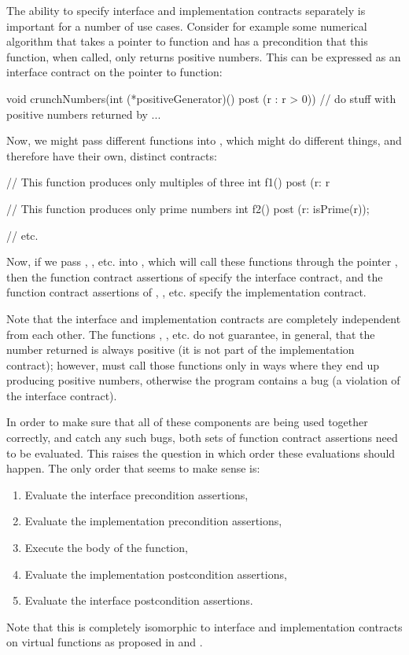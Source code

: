 The ability to specify interface and implementation contracts separately is important for a number of use cases. Consider for example some numerical algorithm  that takes a pointer to function and has a precondition that this function, when called, only returns positive numbers. This can be expressed as an interface contract on the pointer to function:
\begin{codeblock}
void crunchNumbers(int (*positiveGenerator)() post (r : r > 0)) {
  // do stuff with positive numbers returned by ...
}
\end{codeblock}
Now, we might pass different functions into , which might do different things, and therefore have their own, distinct contracts:
\begin{codeblock}
// This function produces only multiples of three
int f1() post (r: r %

// This function produces only prime numbers
int f2() post (r: isPrime(r));

// etc.
\end{codeblock}
Now, if we pass , , etc. into , which will call these functions through the pointer , then the function contract assertions of  specify the interface contract, and the function contract assertions of , , etc. specify the implementation contract.

Note that the interface and implementation contracts are completely independent from each other. The functions , , etc. do not guarantee, in general, that the number returned is always positive (it is not part of the implementation contract); however,  must call those
functions only in ways where they end up producing positive numbers, otherwise the program contains a bug (a violation of the interface contract). 

In order to make sure that all of these components are being used together correctly, and catch any such bugs, both sets of function contract assertions need to be evaluated. This raises the question in which order these evaluations should happen. The only order that seems to make sense is:
\begin{enumerate}
\item Evaluate the interface precondition assertions,
\item Evaluate the implementation precondition assertions,
\item Execute the body of the function,
\item Evaluate the implementation postcondition assertions,
\item Evaluate the interface postcondition assertions.
\end{enumerate}
Note that this is completely isomorphic to interface and implementation contracts on virtual functions as proposed in \cite{P3097R0} and \cite{P3165R0}.

